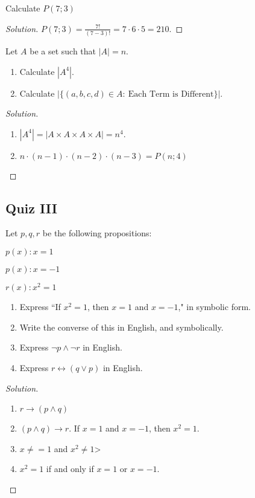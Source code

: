 \documentclass[../main.tex]{subfiles}
\begin{document}
\begin{problem}
Calculate $P(7;3)$
\end{problem}
\begin{proof}[Solution]
$P(7;3) = \frac{7!}{(7-3)!} = 7\cdot 6 \cdot 5 = 210$.
\end{proof}

\begin{problem}
Let $A$ be a set such that $|A| = n$.
\begin{enumerate}
\item Calculate $|A^4|$.
\item Calculate $|\{(a,b,c,d)\in A:\ \textrm{Each Term is Different}\}|$.
\end{enumerate}
\end{problem}
\begin{proof}[Solution]
\
\begin{enumerate}
\item $|A^4| = |A\times A \times A \times A| = n^4$.
\item $n \cdot (n-1)\cdot (n-2)\cdot (n-3) = P(n;4)$
\end{enumerate}
\end{proof}
%
\subsection{Quiz III}
%
\begin{problem}
Let $p,q,r$ be the following propositions:
\begin{enumerate}
\begin{multicols}{3}
\item[] $p(x):	x = 1$
\item[] $p(x):	x = -1$
\item[] $r(x):	x^2 = 1$
\end{multicols}
\end{enumerate}
\begin{enumerate}
\item Express ``If $x^2 = 1$, then $x=1$ and $x=-1$," in symbolic form.
\item Write the converse of this in English, and symbolically.
\item Express $\neg p \land \neg r$ in English.
\item Express $r\leftrightarrow (q\lor p)$ in English.
\end{enumerate}
\end{problem}
\begin{proof}[Solution]
\
\begin{enumerate}
\item $r\rightarrow (p\land q)$
\item $(p\land q) \rightarrow r$. If $x=1$ and $x=-1$, then $x^2 = 1$.
\item $x\ne = 1$ and $x^2 \ne 1$>
\item $x^2 = 1$ if and only if $x=1$ or $x=-1$.
\end{enumerate}
\end{proof}
\end{document}
